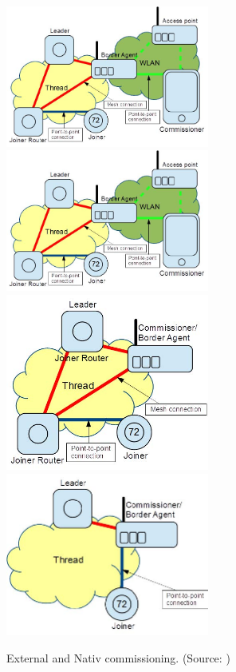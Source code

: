 \begin{figure}[!ht]
	\centering
	\includegraphics[width=67mm, keepaspectratio]{figures/external1-Final_12639Thread_1.3.jpg}\hspace{1cm}
	\includegraphics[width=67mm, keepaspectratio]{figures/external1-Final_12639Thread_1.3.jpg}\\\vspace{5mm}
	\includegraphics[width=67mm, keepaspectratio]{figures/native1-Final_12639Thread_1.3.jpg}\hspace{1cm}
	\includegraphics[width=67mm, keepaspectratio]{figures/native2-Final_12639Thread_1.3.jpg}
	\caption{External and Nativ commissioning. (Source: \cite{thread:130})}
	\label{fig:ot:commissioning}
\end{figure}


